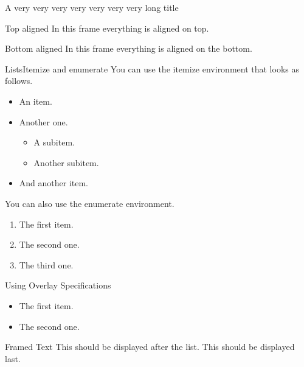 %
%
%
%
%
\begin{frame}{A very very very very very very very long title}

\end{frame}
%
%
%
%
%
\begin{frame}[t]{Top aligned}
In this frame everything is aligned on top.
\end{frame}
%
%
%
%
%
\begin{frame}[b]{Bottom aligned}
In this frame everything is aligned on the bottom.
\end{frame}
%
%
%
%
%
\begin{frame}{Lists}{Itemize and enumerate}
You can use the itemize environment that looks as follows.
\begin{itemize}
\item An item.
\item Another one.
\begin{itemize}
\item A subitem.
\item Another subitem.
\end{itemize}
\item And another item.
\end{itemize}
%
\vfill%
You can also use the enumerate environment.
\begin{enumerate}
\item The first item.
\item The second one.
\item The third one.
\end{enumerate}
\end{frame}

\begin{frame}{Using Overlay Specifications}
\begin{itemize}[<+(1)->]
\item The first item.
\item The second one.
\end{itemize}
\pause
\begin{block}{Framed Text}
This should be displayed after the list.
\pause
This should be displayed last.
\end{block}
\end{frame}
%
%
%
%
%
